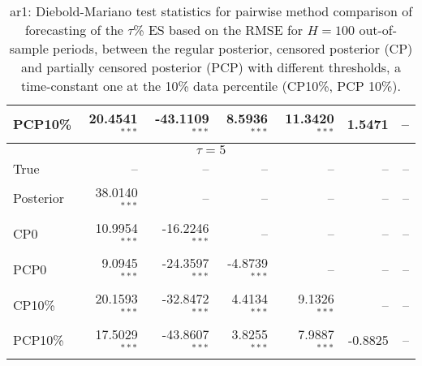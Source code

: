 {{\begin{table}
\begin{tabular}{l | rrrrrr}
PCP10\% & 20.4541$^{***}$ & -43.1109$^{***}$ & 8.5936$^{***}$ & 11.3420$^{***}$ & 1.5471\phantom{$^{***}$} &    --\phantom{$^{***}$}   \\ 
\hline 
\multicolumn{7}{c}{$\tau = 5$} \\ \hline 
True &    --\phantom{$^{***}$} &    --\phantom{$^{***}$} &    --\phantom{$^{***}$} &    --\phantom{$^{***}$} &    --\phantom{$^{***}$} &    --\phantom{$^{***}$}   \\ 
Posterior & 38.0140$^{***}$ &    --\phantom{$^{***}$} &    --\phantom{$^{***}$} &    --\phantom{$^{***}$} &    --\phantom{$^{***}$} &    --\phantom{$^{***}$}   \\ 
CP0 & 10.9954$^{***}$ & -16.2246$^{***}$ &    --\phantom{$^{***}$} &    --\phantom{$^{***}$} &    --\phantom{$^{***}$} &    --\phantom{$^{***}$}   \\ 
PCP0 & 9.0945$^{***}$ & -24.3597$^{***}$ & -4.8739$^{***}$ &    --\phantom{$^{***}$} &    --\phantom{$^{***}$} &    --\phantom{$^{***}$}   \\ 
CP10\% & 20.1593$^{***}$ & -32.8472$^{***}$ & 4.4134$^{***}$ & 9.1326$^{***}$ &    --\phantom{$^{***}$} &    --\phantom{$^{***}$}   \\ 
PCP10\% & 17.5029$^{***}$ & -43.8607$^{***}$ & 3.8255$^{***}$ & 7.9887$^{***}$ & -0.8825\phantom{$^{***}$} &    --\phantom{$^{***}$}   \\ 
\hline 
\end{tabular}
 \caption{ar1: Diebold-Mariano test statistics for pairwise method comparison  of forecasting of the $\tau$\%  ES based on  the RMSE for $H=100$ out-of-sample periods,  between  the regular posterior, censored posterior (CP) and  partially censored posterior (PCP) with different thresholds,  a time-constant one at the 10\% data percentile (CP10\%, PCP 10\%). }
\label{tab:ar1_DM_es_T1000}  
\end{table}
}}